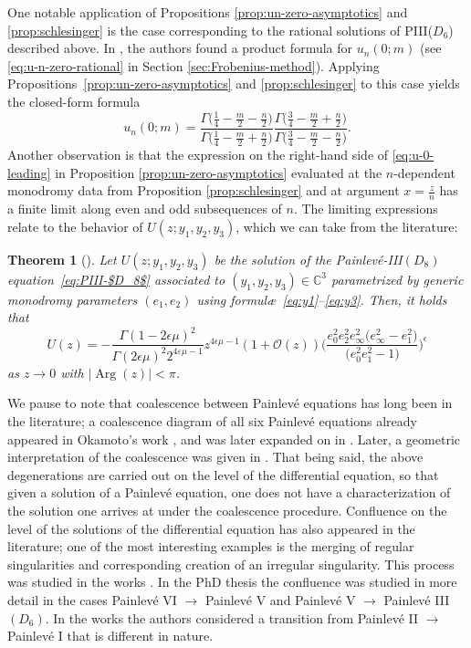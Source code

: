 \documentclass[11pt]{article}
\numberwithin{equation}{section}
\numberwithin{equation}{section}
\newtheorem{Theorem}{Theorem}[section]
\newcommand{\C}{{\mathbb{C}}}
\renewcommand{\arg}{\operatorname{Arg}}
\begin{document}
One notable application of Propositions \ref{prop:un-zero-asymptotics} and \ref{prop:schlesinger} is the case corresponding to the rational solutions of PIII($D_6$) described above. In \cite{clarkson2018constructive}, the authors found a product formula for $u_n(0;m)$ (see \eqref{eq:u-n-zero-rational} in Section \ref{sec:Frobenius-method}). Applying Propositions~\ref{prop:un-zero-asymptotics} and \ref{prop:schlesinger} to this case yields the closed-form formula
\begin{equation}\label{eq:u-n-rat-leading}
u_n(0;m)=\frac{\Gamma\big(\frac{1}{4}-\frac{m}{2}-\frac{n}{2}\big)}{\Gamma \big(\frac{1}{4}-\frac{m}{2}+\frac{n}{2} \big)}\frac{\Gamma \big(\frac{3}{4}-\frac{m}{2}+\frac{n}{2} \big)}{\Gamma \big(\frac{3}{4}-\frac{m}{2}-\frac{n}{2} \big)}.
\end{equation}
Another observation is that the expression on the right-hand side of \eqref{eq:u-0-leading} in Proposition \ref{prop:un-zero-asymptotics} evaluated at the $n$-dependent monodromy data from Proposition \ref{prop:schlesinger} and at argument $x=\frac{z}{n}$ has a finite limit along even and odd subsequences of $n$. The limiting expressions relate to the behavior of $U(z;y_1,y_2,y_3)$, which we can take from the literature:
\begin{Theorem}[\cite{FIKN,IN,N}] \label{thm:D8-asymptotics-zero}
 Let $U(z;y_1,y_2,y_3)$ be the solution of the Painlev\'e-{\rm III}$(D_8)$ equation~\eqref{eq:PIII-$D_8$} associated to $(y_1,y_2,y_3) \in \C^3$ parametrized by generic monodromy parameters $(e_1,e_2)$ using formul\ae\ \eqref{eq:y1}--\eqref{eq:y3}. Then, it holds that
 \begin{equation*}
 U(z) = -\frac{ \Gamma (1 - 2\epsilon \mu)^2 }{\Gamma (2\epsilon \mu )^2 2^{4\varepsilon\mu-1} } z^{4 \epsilon \mu - 1} (1 + \mathcal{O}(z) )\Bigg(\dfrac{e_{0}^2 e_2^2 e_{\infty}^2 \big(e_{\infty}^2-e_{1}^2\big)}{
 \big(e_{0}^2 e_{1}^2-1\big)}\Bigg)^{\epsilon}
 \end{equation*}
 as $z\to 0$ with $|{\arg}(z)|<\pi$.
\end{Theorem}
We pause to note that coalescence between Painlev\'e equations has long been in the literature; a coalescence diagram of all six Painlev\'e equations already appeared in Okamoto's work \cite{O1}, and was later expanded on in \cite{OO}. Later, a geometric interpretation of the coalescence was given in \cite{CMR}. That being said, the above degenerations are carried out on the level of the differential equation, so that given a solution of a Painlev\'e equation, one does not have a characterization of the solution one arrives at under the coalescence procedure. Confluence on the level of the solutions of the differential equation has also appeared in the literature; one of the most interesting examples is the merging of regular singularities and corresponding creation of an irregular singularity. This process was studied in the works \cite{Glutsuk,Kitaev06}. In the PhD thesis \cite{Horrobin} the confluence was studied in more detail in the cases Painlev\'e VI $\to$ Painlev\'e V and Painlev\'e V $\to$ Painlev\'e III$(D_6)$. In the works \cite{Kapaev94,Kapaev_Kitaev} the authors considered a transition from Painlev\'e II $\to$ Painlev\'e I that is different in nature.
\end{document}
